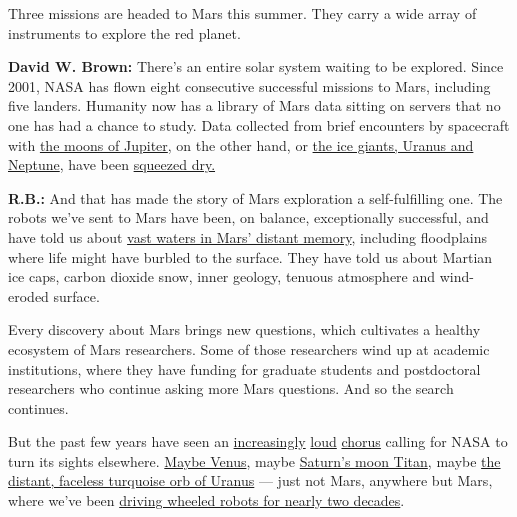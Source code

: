 Three missions are headed to Mars this summer. They carry a wide array
of instruments to explore the red planet.

\textbf{David W. Brown:} There's an entire solar system waiting to be
explored. Since 2001, NASA has flown eight consecutive successful
missions to Mars, including five landers. Humanity now has a library of
Mars data sitting on servers that no one has had a chance to study. Data
collected from brief encounters by spacecraft with
\href{https://www.nytimes3xbfgragh.onion/2018/05/14/science/europa-plumes-water.html}{the
moons of Jupiter}, on the other hand, or
\href{https://www.nytimes3xbfgragh.onion/2019/02/20/science/neptune-moon-hippocamp.html}{the
ice giants, Uranus and Neptune}, have been
\href{https://www.nytimes3xbfgragh.onion/2020/03/27/science/uranus-bubble-voyager.html}{squeezed
dry.}

\textbf{R.B.:} And that has made the story of Mars exploration a
self-fulfilling one. The robots we've sent to Mars have been, on
balance, exceptionally successful, and have told us about
\href{https://www.nytimes3xbfgragh.onion/2020/07/24/science/mars-life-water.html}{vast
waters in Mars' distant memory}, including floodplains where life might
have burbled to the surface. They have told us about Martian ice caps,
carbon dioxide snow, inner geology, tenuous atmosphere and wind-eroded
surface.

Every discovery about Mars brings new questions, which cultivates a
healthy ecosystem of Mars researchers. Some of those researchers wind up
at academic institutions, where they have funding for graduate students
and postdoctoral researchers who continue asking more Mars questions.
And so the search continues.

But the past few years have seen an
\href{https://www.nature.com/articles/d41586-019-01730-5}{increasingly}
\href{https://www.sciencemag.org/news/2017/01/venus-can-wait-jilted-scientists-face-years-without-nasa-return-earth-s-neighbor}{loud}
\href{https://www.theatlantic.com/science/archive/2017/01/venus-lost-generation/513479/}{chorus}
calling for NASA to turn its sights elsewhere.
\href{https://www.nytimes3xbfgragh.onion/2020/01/09/science/venus-volcanoes-active.html}{Maybe
Venus}, maybe
\href{https://www.nytimes3xbfgragh.onion/2020/03/10/science/saturn-titan-moon.html}{Saturn's
moon Titan}, maybe
\href{https://www.nytimes3xbfgragh.onion/2020/03/27/science/uranus-bubble-voyager.html}{the
distant, faceless turquoise orb of Uranus} --- just not Mars, anywhere
but Mars, where we've been
\href{https://www.nytimes3xbfgragh.onion/2019/02/13/science/mars-opportunity-rover-dead.html}{driving
wheeled robots for nearly two decades}.

